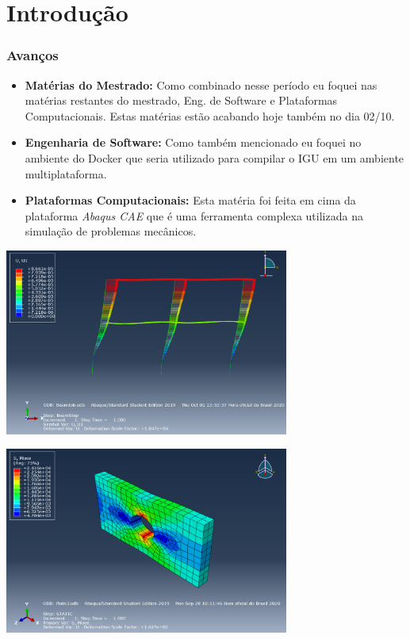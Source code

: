 \documentclass[10pt]{beamer}
\theoremstyle{remark}
\theoremstyle{definition}
\begin{document}
\section{Introdução}
\begin{frame}[allowframebreaks]
\frametitle{Avanços}

	\begin{itemize}
		\item \textbf{Matérias do Mestrado: } Como combinado nesse período eu foquei nas matérias restantes do mestrado, Eng. de Software e Plataformas Computacionais. Estas matérias estão acabando hoje também no dia 02/10.
		
		\item \textbf{Engenharia de Software: }Como também mencionado eu foquei no ambiente do Docker que seria utilizado para compilar o IGU em um ambiente multiplataforma.
		
		\item \textbf{Plataformas Computacionais: }Esta matéria foi feita em cima da plataforma \textit{Abaqus CAE} que é uma ferramenta complexa utilizada na simulação de problemas mecânicos.
	\end{itemize}
	
	\framebreak
	
	\begin{center}
		\includegraphics[width=0.7\textwidth]{images/004.png}
	\end{center}
	
	\framebreak
	
	\begin{center}
		\includegraphics[width=0.7\textwidth]{images/007.png}
	\end{center}
	

\end{frame}
\end{document}
